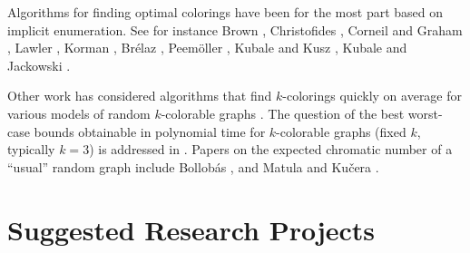 Algorithms for finding optimal colorings have been for the most part
based on implicit enumeration.  See for instance Brown \cite{Br72},
Christofides \cite{Ch71,Ch75}, Corneil and Graham \cite{CoGr73},
Lawler \cite{La76}, Korman \cite{Ko79}, Br\'elaz \cite{Br79},
Peem\"{o}ller \cite{Pe83}, Kubale and Kusz \cite{KuKu83}, Kubale and
Jackowski \cite{KuJa85}.

Other work has considered algorithms that find $k$-colorings quickly
on average for various models of random $k$-colorable graphs
\cite{Ku77,Tu88,Ku89,Bl90,DyFr89,FuSu92}.  The question of the best worst-case bounds
obtainable in polynomial time for $k$-colorable graphs (fixed $k$, typically
$k=3$) is addressed in \cite{Wi83,Bl89,Bl90}.  Papers on the expected
chromatic number of a ``usual'' random graph include Bollob\'as
\cite{Bo}, and Matula and Ku{\v c}era \cite{MaKu90}.

\section{Suggested Research Projects}

\label{sec:open}

